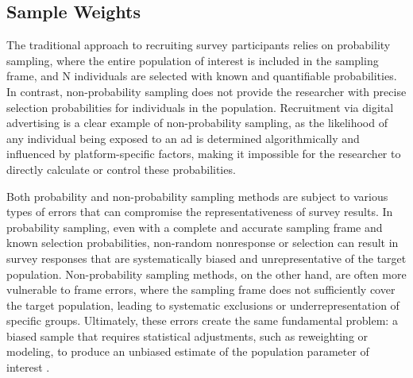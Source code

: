 \subsection{Sample Weights}

The traditional approach to recruiting survey participants relies on probability sampling, where the entire population of interest is included in the sampling frame, and N individuals are selected with known and quantifiable probabilities. In contrast, non-probability sampling does not provide the researcher with precise selection probabilities for individuals in the population. Recruitment via digital advertising is a clear example of non-probability sampling, as the likelihood of any individual being exposed to an ad is determined algorithmically and influenced by platform-specific factors, making it impossible for the researcher to directly calculate or control these probabilities.

Both probability and non-probability sampling methods are subject to various types of errors that can compromise the representativeness of survey results. In probability sampling, even with a complete and accurate sampling frame and known selection probabilities, non-random nonresponse or selection can result in survey responses that are systematically biased and unrepresentative of the target population. Non-probability sampling methods, on the other hand, are often more vulnerable to frame errors, where the sampling frame does not sufficiently cover the target population, leading to systematic exclusions or underrepresentation of specific groups. Ultimately, these errors create the same fundamental problem: a biased sample that requires statistical adjustments, such as reweighting or modeling, to produce an unbiased estimate of the population parameter of interest \citep{Kolenikov2016}.





